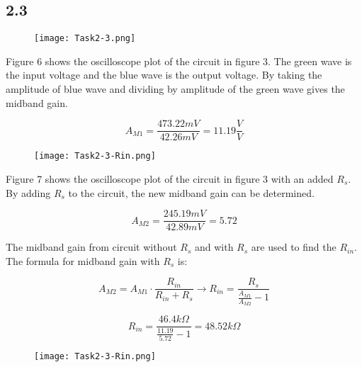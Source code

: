 \pagebreak
\subsection*{2.3}

    \begin{figure}[h!]
        \centering
        \texttt{[image: Task2-3.png]}
    \end{figure}

	Figure 6 shows the oscilloscope plot of the circuit in figure 3. The green wave is the input voltage and the blue wave is the output voltage. By taking the amplitude of blue wave and dividing by amplitude of the green wave gives the midband gain.

	$$ A_{M1} = \frac{473.22 mV}{42.26 mV} = 11.19 \frac{V}{V} $$

\pagebreak

    \begin{figure}[h!]
        \centering
        \texttt{[image: Task2-3-Rin.png]}
    \end{figure}

	Figure 7 shows the oscilloscope plot of the circuit in figure 3 with an added $R_{s}$. By adding $R_{s}$ to the circuit, the new midband gain can be determined.

	$$ A_{M2} = \frac{245.19 mV}{42.89 mV} = 5.72 $$

	The midband gain from circuit without $R_{s}$ and with $R_{s}$ are used to find the $R_{in}$. The formula for midband gain with $R_{s}$ is:  

	$$A_{M2} = A_{M1} \cdot \frac{R_{in}}{R_{in} + R_{s}} \rightarrow R_{in} = \frac{R_{s}}{\frac{A_{M1}}{A_{M2}}-1}  $$

	$$  R_{in} = \frac{46.4 k \Omega }{\frac{11.19}{5.72}-1} = 48.52 k \Omega$$ 

\pagebreak

	\begin{figure}[h!]
        \centering
        \texttt{[image: Task2-3-Rin.png]}
    \end{figure}

